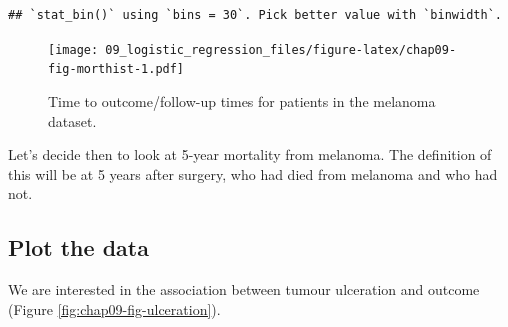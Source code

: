 \documentclass[
  12pt,
  krantz2]{krantz}
\makeatletter
\newenvironment{Shaded}{\begin{snugshade}}{\end{snugshade}}
\newcommand{\CommentTok}[1]{\textcolor[rgb]{0.56,0.35,0.01}{\textit{#1}}}
\newcommand{\DataTypeTok}[1]{\textcolor[rgb]{0.13,0.29,0.53}{#1}}
\newcommand{\DecValTok}[1]{\textcolor[rgb]{0.00,0.00,0.81}{#1}}
\newcommand{\KeywordTok}[1]{\textcolor[rgb]{0.13,0.29,0.53}{\textbf{#1}}}
\newcommand{\NormalTok}[1]{#1}
\newcommand{\OperatorTok}[1]{\textcolor[rgb]{0.81,0.36,0.00}{\textbf{#1}}}
\newcommand{\StringTok}[1]{\textcolor[rgb]{0.31,0.60,0.02}{#1}}
\newenvironment{kframe}{%
\medskip{}
\setlength{\fboxsep}{.8em}
 \def\at@end@of@kframe{}%
 \ifinner\ifhmode%
  \def\at@end@of@kframe{\end{minipage}}%
  \begin{minipage}{\columnwidth}%
 \fi\fi%
 \def\FrameCommand##1{\hskip\@totalleftmargin \hskip-\fboxsep
 \colorbox{shadecolor}{##1}\hskip-\fboxsep
     \hskip-\linewidth \hskip-\@totalleftmargin \hskip\columnwidth}%
 \MakeFramed {\advance\hsize-\width
   \@totalleftmargin\z@ \linewidth\hsize
   \@setminipage}}%
 {\par\unskip\endMakeFramed%
 \at@end@of@kframe}
\renewenvironment{Shaded}{\begin{kframe}}{\end{kframe}}
\makeatother
\begin{document}
\begin{verbatim}
## `stat_bin()` using `bins = 30`. Pick better value with `binwidth`.
\end{verbatim}

\begin{figure}
\centering
\texttt{[image: 09\_logistic\_regression\_files/figure-latex/chap09-fig-morthist-1.pdf]}
\caption{\label{fig:chap09-fig-morthist}Time to outcome/follow-up times for patients in the melanoma dataset.}
\end{figure}

Let's decide then to look at 5-year mortality from melanoma.
The definition of this will be at 5 years after surgery, who had died from melanoma and who had not.

\begin{Shaded}
\end{Shaded}

\hypertarget{plot-the-data-6}{%
\subsection{Plot the data}\label{plot-the-data-6}}

We are interested in the association between tumour ulceration and outcome (Figure \ref{fig:chap09-fig-ulceration}).
\end{document}
